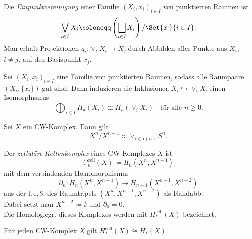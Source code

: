 \documentclass{cheat-sheet}
\newcommand{\RH}{\tilde{H}} %
\newcommand{\cell}{\text{cell}} %
\newcommand{\leS}{l.\,e.\,S.} %
\begin{document}
\begin{defn}
  Die \emph{Einpunktvereinigung} einer Familie $(X_i, x_i)_{i \in I}$ von punktierten Räumen ist
  \[ \bigvee_{i \in I} X_i \coloneqq \left( \bigsqcup_{i \in I} X_i \right) / \Set{x_i}{i \in I}. \]
  Man erhält Projektionen $q_j : \vee_i X_i \to X_j$ durch Abbilden aller Punkte aus $X_i$, $i \not= j$. auf den Basispunkt $x_j$.
\end{defn}

\begin{prop}
  Sei $(X_i, x_i)_{i \in I}$ eine Familie von punktierten Räumen, sodass alle Raumpaare $(X_i, \{ x_i \})$ gut sind. Dann induzieren die Inklusionen $X_i \hookrightarrow \vee_i X_i$ einen Isomorphismus
  \[
    \bigoplus_{i \in I} \RH_n(X_i) \cong \RH_n\left( \vee_i X_i \right) \quad
    \text{für alle $n \geq 0$.}
  \]
\end{prop}

\begin{lem}
  Sei $X$ ein CW-Komplex. Dann gilt
  \[ X^n/X^{n-1} \approx \vee_{i \in I(n)} S^n. \]
\end{lem}

\begin{kor}
   \quad
\end{kor}

\begin{prop}
   \quad
\end{prop}

\begin{defn}
  Der \emph{zelluläre Kettenkomplex} eines CW-Komplexes $X$ ist
  \[ C^\cell_n(X) \coloneqq H_n(X^n, X^{n-1}) \]
  mit dem verbindenden Homomorphismus
  \[ \partial_n : H_n(X^n, X^{n-1}) \to H_{n-1}(X^{n-1}, X^{n-2}) \]
  aus der \leS{} des Raumtripels $(X^n, X^{n-1}, X^{n-2})$ als Randabb.\\
  Dabei setzt man $X^{n-2} \coloneqq \emptyset$ und $\partial_0 = 0$.\\
  Die Homologiegr. dieses Komplexes werden mit $H_*^\cell(X)$ bezeichnet.
\end{defn}

\begin{prop}
  Für jeden CW-Komplex $X$ gilt $H_*^\cell(X) \cong H_*(X)$.
\end{prop}
\end{document}
